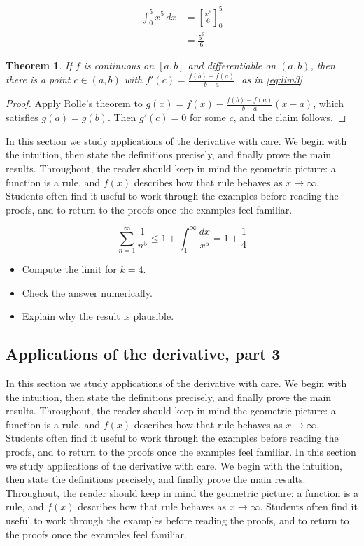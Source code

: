 \documentclass[11pt]{article}
\newtheorem{theorem}{Theorem}[section]
\begin{document}
\begin{align}
  \int_0^{5} x^{5}\,dx &= \left[ \frac{x^{6}}{6} \right]_0^{5} \\
  &= \frac{5^{6}}{6} \label{eq:int3}
\end{align}

\begin{theorem}
If $f$ is continuous on $[a,b]$ and differentiable on $(a,b)$, then there is a point $c \in (a,b)$ with $f'(c) = \frac{f(b)-f(a)}{b-a}$, as in \eqref{eq:lim3}.
\end{theorem}

\begin{proof}
Apply Rolle's theorem to $g(x) = f(x) - \frac{f(b)-f(a)}{b-a}(x-a)$, which satisfies $g(a) = g(b)$. Then $g'(c) = 0$ for some $c$, and the claim follows.
\end{proof}

In this section we study applications of the derivative with care. We begin with the intuition, then state the definitions precisely, and finally prove the main results. Throughout, the reader should keep in mind the geometric picture: a function is a rule, and $f(x)$ describes how that rule behaves as $x \to \infty$. Students often find it useful to work through the examples before reading the proofs, and to return to the proofs once the examples feel familiar. 

\[
  \sum_{n=1}^{\infty} \frac{1}{n^{5}} \le 1 + \int_1^{\infty} \frac{dx}{x^{5}} = 1 + \frac{1}{4}
\]

\begin{itemize}
  \item Compute the limit for $k = 4$.
  \item Check the answer numerically.
  \item Explain why the result is plausible.
\end{itemize}

\subsection{Applications of the derivative, part 3}

In this section we study applications of the derivative with care. We begin with the intuition, then state the definitions precisely, and finally prove the main results. Throughout, the reader should keep in mind the geometric picture: a function is a rule, and $f(x)$ describes how that rule behaves as $x \to \infty$. Students often find it useful to work through the examples before reading the proofs, and to return to the proofs once the examples feel familiar. In this section we study applications of the derivative with care. We begin with the intuition, then state the definitions precisely, and finally prove the main results. Throughout, the reader should keep in mind the geometric picture: a function is a rule, and $f(x)$ describes how that rule behaves as $x \to \infty$. Students often find it useful to work through the examples before reading the proofs, and to return to the proofs once the examples feel familiar. 
\end{document}
